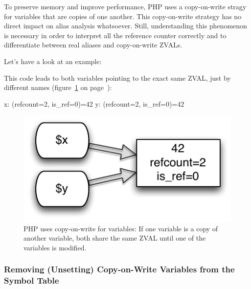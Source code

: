To preserve memory and improve performance, PHP uses a copy-on-write stragy for variables that are copies of one another. This copy-on-write strategy has no direct im\-pact on alias analysis whatsoever. Still, understanding this phenomenon is necessary in order to interpret all the reference counter correctly and to differentiate between real aliases and copy-on-write ZVALs.

Let's have a look at an example:


This code leads to both variables pointing to the exact same ZVAL, just by different names (figure~\ref{fig:copy-on-write-variable} on page~\pageref{fig:copy-on-write-variable}):

\begin{textcode}
x: (refcount=2, is_ref=0)=42
y: (refcount=2, is_ref=0)=42
\end{textcode}

\begin{figure}[!h]
  \begin{center}
    \includegraphics[scale=0.8]{images/x_y_42}
    \caption{PHP uses copy-on-write for variables: If one variable is a copy of another variable, both share the same ZVAL until one of the variables is modified.}
    \label{fig:copy-on-write-variable}
  \end{center}
\end{figure}


\subsubsection{Removing (Unsetting) Copy-on-Write Variables from the Symbol Table}
\label{sec:unsetting}

